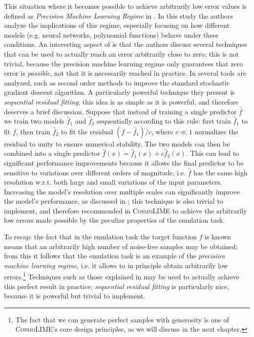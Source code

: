This situation where it becomes possible to achieve arbitrarily low error values is defined as \emph{Precision Machine Learning Regime} in \cite{precision_ml}. In this study the authors analyze the implications of this regime, especially focusing on how different models (e.g. neural networks, polynomial functions) behave under these conditions.
An interesting aspect of \cite{precision_ml} is that the authors discuss several techniques that can be used to actually reach an error arbitrarily close to zero; this is not trivial, because the precision machine learning regime only guarantees that zero error is \emph{possible}, not that it is necessarily reached in practice.
In \cite{precision_ml} several tools are analyzed, such as second order methods to improve the standard stochastic gradient descent algorithm. A particularly powerful technique they present is \emph{sequential residual fitting}; this idea is as simple as it is powerful, and therefore deserves a brief discussion.
Suppose that instead of training a single predictor $\hat{f}$ we train two models $\hat{f}_1$ and $\hat{f}_2$ sequentially according to this rule: first train $\hat{f}_1$ to fit $f$, then train $\hat{f}_2$ to fit the residual $(f-\hat{f}_1)/c$, where $c\ll 1$ normalizes the residual to unity to ensure numerical stability. The two models can then be combined into a single predictor $\hat{f}(x) = \hat{f}_1(x)+c\hat{f}_2(x)$.
This can lead to significant performance improvements because it allows the final predictor to be sensitive to variations over different orders of magnitude, i.e. $\hat{f}$ has the same high resolution w.r.t. both large and small variations of the input parameters. Increasing the model's resolution over multiple scales can significantly improve the model's performance, as discussed in \cite{precision_ml}; this technique is also trivial to implement, and therefore recommended in \textsc{CosmoLIME} to achieve the arbitrarily low errors made possible by the peculiar properties of the emulation task.

To recap: the fact that in the emulation task the target function $f$ is known means that an arbitrarily high number of noise-free samples may be obtained; from this it follows that the emulation task is an example of the \emph{precision machine learning regime}, i.e. it allows to in principle obtain arbitrarily low errors.\footnote{The fact that we can generate perfect samples with generosity is one of \textsc{CosmoLIME}'s core design principles, as we will discuss in the next chapter.}
Techniques such as those explained in \cite{precision_ml} may be used to actually achieve this perfect result in practice; \emph{sequential residual fitting} is particularly nice, because it is powerful but trivial to implement.